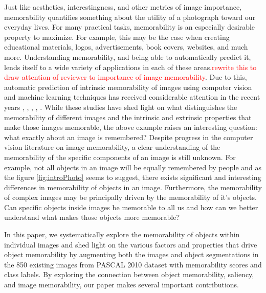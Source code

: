 Just like aesthetics, interestingness, and other metrics of image importance, memorability quantifies something about the utility of a photograph toward our everyday lives. For many practical tasks, memorability is an especially desirable property to maximize. For example, this may be the case when creating educational materials, logos, advertisements, book covers, websites, and much more. Understanding memorability, and being able to automatically predict it, lends itself to a wide variety of applications in each of these areas.\textcolor{red}{rewrite this to draw attention of reviewer to importance of image memorability}. Due to this, automatic prediction of intrinsic memorability of images using computer vision and machine learning techniques has received considerable attention in the recent years \cite{isola11}, \cite{khosla12}, \cite{isola14}, \cite{zoya15}, \cite{kim13}. While these studies have shed light on what distinguishes the memorability of different images and the intrinsic and extrinsic properties that make those images memorable, the above example raises an interesting question: what exactly about an image is remembered? Despite progress in the computer vision literature on image memorability, a clear understanding of the memorability of the specific components of an image is still unknown. For example, not all objects in an image will be equally remembered by people and as the figure \ref{fig:introPhoto} seems to suggest, there exists significant and interesting differences in memorability of objects in an image. Furthermore, the memorability of complex images may be principally driven by the memorability of it's objects. Can specific objects inside images be memorable to all us and how can we better understand what makes those objects more memorable?


In this paper, we systematically explore the memorability of objects within individual images and shed light on the various factors and properties that drive object memorability by augmenting both the images and object segmentations in the 850 existing images from PASCAL 2010 \cite{pascal10} dataset with memorability scores and class labels. By exploring the connection between object memorability, saliency, and image memorability, our paper makes several important contributions.

